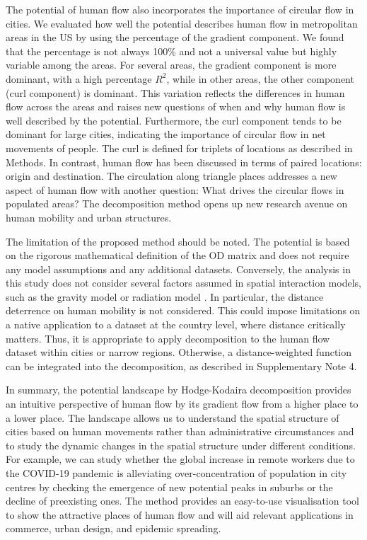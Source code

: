 \documentclass[]{article}
\begin{document}
The potential of human flow also incorporates the importance of circular flow in cities.
We evaluated how well the potential describes human flow in metropolitan areas in the US by using the percentage of the gradient component.
We found that the percentage is not always 100\% and not a universal value
but highly variable among the areas.
For several areas, the gradient component is more dominant, with a high percentage $R^2$,
while in other areas,  the other component (curl component) is dominant.
This variation reflects the differences in human flow across the areas
and raises new questions of when and why human flow is well described by the potential. %
Furthermore, the curl component tends to be dominant for large cities,
indicating the importance of circular flow in net movements of people.
The curl is defined for triplets of locations as described in Methods.
In contrast, human flow has been discussed in terms of paired locations: origin and  destination.
The circulation along triangle places addresses a new aspect of human flow with another question: What drives the circular flows in populated areas?
The decomposition method opens up new research avenue on human mobility and urban structures.
%

The limitation of the proposed method should be noted.
The potential is based on the rigorous mathematical definition of the OD matrix and 
does not require any model assumptions and any additional datasets.
Conversely, the analysis in this study does not consider several factors assumed in spatial interaction models, such as the gravity model \cite{gravity_zipf1946,Ullman1956,WilsonBook1974} or radiation model \cite{Simini2012}.
In particular, the distance deterrence on human mobility is not considered.
This could impose limitations on a native application  to a dataset at the country level, where distance  critically matters.
%
Thus, it is appropriate to apply decomposition to the human flow dataset within cities or narrow regions.
Otherwise, a distance-weighted function  can be integrated into the decomposition, as described in Supplementary Note 4.

In summary, 
the potential landscape by Hodge-Kodaira decomposition provides an intuitive perspective of human flow by its gradient flow from a higher place to a lower place.
The landscape allows us  to understand the spatial structure of cities based on  human movements rather than administrative circumstances
and to study the dynamic changes in the spatial structure under different conditions.
%
%
%
%
%
For example, we can study whether the global increase in remote workers due to the COVID-19 pandemic is alleviating over-concentration of population in city centres by checking the emergence of new potential peaks in suburbs or the decline of preexisting ones. 
%
%
%
%
The method  provides an easy-to-use visualisation tool to show the attractive places of  human flow and will aid relevant applications  in commerce, urban design, and epidemic spreading.
%
%
\end{document}
